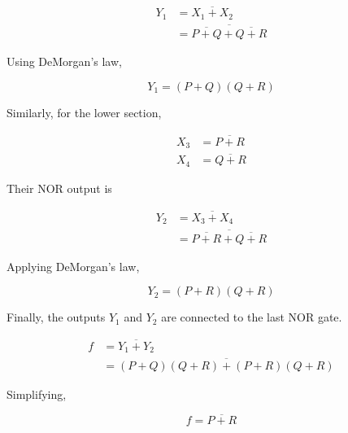 \documentclass[12pt]{article}
\begin{document}
\begin{align*}
Y_1 
&= \overline{X_1 + X_2} \\
&= \overline{\overline{P+Q} + \overline{Q+R}}
\end{align*}

Using DeMorgan's law,

$$
Y_1 = (P+Q)(Q+R)
$$

Similarly, for the lower section,

\begin{align*}
X_3 &= \overline{P+R} \\
X_4 &= \overline{Q+R}
\end{align*}

Their NOR output is

\begin{align*}
Y_2 
&= \overline{X_3 + X_4} \\
&= \overline{\overline{P+R} + \overline{Q+R}}
\end{align*}

Applying DeMorgan's law,

$$
Y_2 = (P+R)(Q+R)
$$

Finally, the outputs $Y_1$ and $Y_2$ are connected to the last NOR gate.

\begin{align*}
f 
&= \overline{Y_1 + Y_2} \\
&= \overline{(P+Q)(Q+R) + (P+R)(Q+R)}
\end{align*}

Simplifying,

$$
f = \overline{P+R}
$$

\vspace{0.4cm}

\begin{center}
\end{center}
\end{document}

